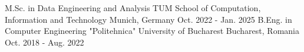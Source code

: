 

\begin{cventries}

  \cventry
    {M.Sc. in Data Engineering and Analysis} %
    {TUM School of Computation, Information and Technology} %
    {Munich, Germany} %
    {Oct. 2022 - Jan. 2025} %
    {
    }
  \cventry
    {B.Eng. in Computer Engineering} %
    {"Politehnica" University of Bucharest} %
    {Bucharest, Romania} %
    {Oct. 2018 - Aug. 2022} %
    {
    }

\end{cventries}
